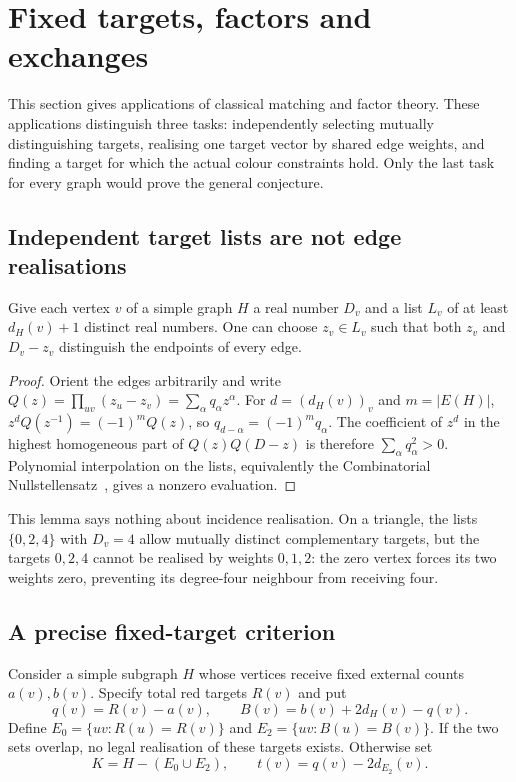 \section{Fixed targets, factors and exchanges}\label{sec:targets}

This section gives applications of classical matching and factor
theory. These applications distinguish three tasks: independently
selecting mutually distinguishing targets, realising one target vector
by shared edge weights, and finding a target for which the actual
colour constraints hold. Only the last task for every graph would
prove the general conjecture.

\subsection{Independent target lists are not edge realisations}

\begin{lemma}\label{lem:complementlists}
Give each vertex $v$ of a simple graph $H$ a real number $D_v$ and a
list $L_v$ of at least $d_H(v)+1$ distinct real numbers. One can
choose $z_v\in L_v$ such that both $z_v$ and $D_v-z_v$ distinguish
the endpoints of every edge.
\end{lemma}
\begin{proof}
Orient the edges arbitrarily and write
$Q(z)=\prod_{uv}(z_u-z_v)=\sum_\alpha q_\alpha z^\alpha$.
For $d=(d_H(v))_v$ and $m=|E(H)|$,
$z^d Q(z^{-1})=(-1)^m Q(z)$, so
$q_{d-\alpha}=(-1)^m q_\alpha$. The coefficient of $z^d$ in
the highest homogeneous part of $Q(z)Q(D-z)$ is therefore
$\sum_\alpha q_\alpha^2>0$. Polynomial interpolation on the lists,
equivalently the Combinatorial Nullstellensatz~\cite{Alon99}, gives
a nonzero evaluation.
\end{proof}

This lemma says nothing about incidence realisation. On a triangle,
the lists $\{0,2,4\}$ with $D_v=4$ allow mutually distinct
complementary targets, but the targets $0,2,4$ cannot be realised
by weights $0,1,2$: the zero vertex forces its two weights zero,
preventing its degree-four neighbour from receiving four.

\subsection{A precise fixed-target criterion}

Consider a simple subgraph $H$ whose vertices receive fixed external
counts $a(v),b(v)$. Specify total red targets $R(v)$ and put
\[
 q(v)=R(v)-a(v),\qquad B(v)=b(v)+2d_H(v)-q(v).
\]
Define $E_0=\{uv:R(u)=R(v)\}$ and
$E_2=\{uv:B(u)=B(v)\}$. If the two sets overlap, no legal realisation
of these targets exists. Otherwise set
\[
 K=H-(E_0\cup E_2),\qquad t(v)=q(v)-2d_{E_2}(v).
\]

